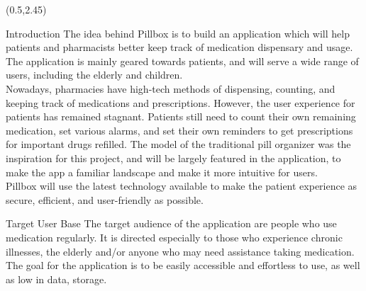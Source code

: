 \documentclass[22pt]{beamer}
\begin{document}
\begin{frame}[fragile]
\begin{textblock}{7.25}(0.5,2.45)
\vspace{2.5cm}
\begin{block}{Introduction}
The idea behind Pillbox is to build an application which will help patients and pharmacists better keep track of medication dispensary and usage. The application is mainly geared towards patients, and will serve a wide range of users, including the elderly and children. \\
Nowadays, pharmacies have high-tech methods of dispensing, counting, and keeping track of medications and prescriptions. However, the user experience for patients has remained stagnant. Patients still need to count their own remaining medication, set various alarms, and set their own reminders to get prescriptions for important drugs refilled. The model of the traditional pill organizer was the inspiration for this project, and will be largely featured in the application, to make the app a familiar landscape and make it more intuitive for users.\\
Pillbox will use the latest technology available to make the patient experience as secure, efficient, and user-friendly as possible.
\end{block}



\begin{block}{Target User Base}
The target audience of the application are people who use medication regularly. It is directed especially to those who experience chronic illnesses, the elderly and/or anyone who may need assistance taking medication. The goal for the application is to be easily accessible and effortless to use, as well as low in data, storage. 
\end{block}





\end{textblock}




\end{frame}
\end{document}
